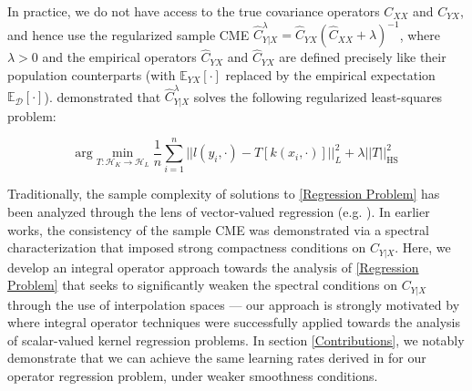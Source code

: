 \documentclass[accepted]{article}
\theoremstyle{definition}
\begin{document}
\par In practice, we do not have access to the true covariance operators $C_{XX}$ and $C_{YX}$, and hence use the regularized sample CME $\hat{C}^{\lambda}_{Y|X} = \hat{C}_{YX}(\hat{C}_{XX} + \lambda)^{-1}$, where $\lambda > 0$ and the empirical operators $\hat{C}_{YX}$ and $\hat{C}_{YX}$ are defined precisely like their population counterparts (with $\mathbb{E}_{YX}[\cdot]$ replaced by the empirical expectation $\mathbb{E}_{\mathcal{D}}[\cdot]$). \cite{grunewalder2012conditional} demonstrated that $\hat{C}^{\lambda}_{Y|X}$ solves the following regularized least-squares problem:
\begin{small}
\begin{equation}
\label{Regression Problem}
    \text{arg} \min_{T: \mathcal{H}_{K} \to \mathcal{H}_L} \frac{1}{n}\sum_{i = 1}^n ||l(y_i, \cdot) - T[k(x_i, \cdot)]||^2_{L} + \lambda||T||^2_{\text{HS}}
\end{equation}
\end{small}

Traditionally, the sample complexity of solutions to \eqref{Regression Problem} has been analyzed through the lens of vector-valued regression (e.g. \cite{park2020measure, grunewalder2012conditional}). In earlier works, the consistency of the sample CME was demonstrated via a spectral characterization \citep{song2010nonparametric} that imposed strong compactness conditions on $C_{Y|X}$. Here, we develop an integral operator approach towards the analysis of \eqref{Regression Problem} that seeks to significantly weaken the spectral conditions on $C_{Y|X}$ through the use of interpolation spaces --- our  approach is strongly motivated by \cite{fischer2020sobolev} where integral operator techniques were successfully applied towards the analysis of scalar-valued kernel regression problems. In section \ref{Contributions}, we notably demonstrate that we can achieve the same learning rates derived in \cite{fischer2020sobolev} for our operator regression problem, under weaker smoothness conditions. 
\end{document}
